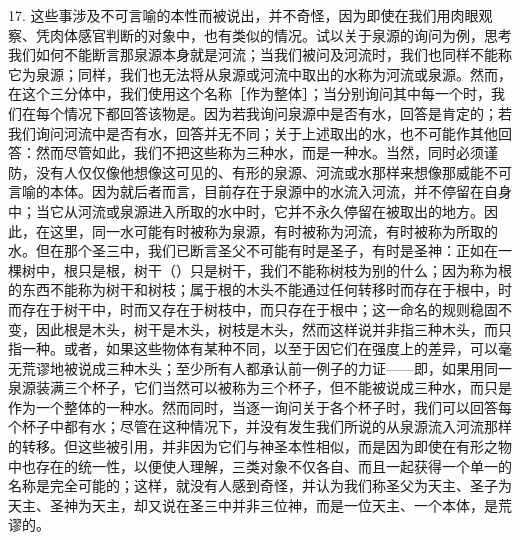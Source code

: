 17. 这些事涉及不可言喻的本性而被说出，并不奇怪，因为即使在我们用肉眼观察、凭肉体感官判断的对象中，也有类似的情况。试以关于泉源的询问为例，思考我们如何不能断言那泉源本身就是河流；当我们被问及河流时，我们也同样不能称它为泉源；同样，我们也无法将从泉源或河流中取出的水称为河流或泉源。然而，在这个三分体中，我们使用这个名称［作为整体］；当分别询问其中每一个时，我们在每个情况下都回答该物是。因为若我询问泉源中是否有水，回答是肯定的；若我们询问河流中是否有水，回答并无不同；关于上述取出的水，也不可能作其他回答：然而尽管如此，我们不把这些称为三种水，而是一种水。当然，同时必须谨防，没有人仅仅像他想像这可见的、有形的泉源、河流或水那样来想像那威能不可言喻的本体。因为就后者而言，目前存在于泉源中的水流入河流，并不停留在自身中；当它从河流或泉源进入所取的水中时，它并不永久停留在被取出的地方。因此，在这里，同一水可能有时被称为泉源，有时被称为河流，有时被称为所取的水。但在那个圣三中，我们已断言圣父不可能有时是圣子，有时是圣神：正如在一棵树中，根只是根，树干（）只是树干，我们不能称树枝为别的什么；因为称为根的东西不能称为树干和树枝；属于根的木头不能通过任何转移时而存在于根中，时而存在于树干中，时而又存在于树枝中，而只存在于根中；这一命名的规则稳固不变，因此根是木头，树干是木头，树枝是木头，然而这样说并非指三种木头，而只指一种。或者，如果这些物体有某种不同，以至于因它们在强度上的差异，可以毫无荒谬地被说成三种木头；至少所有人都承认前一例子的力证——即，如果用同一泉源装满三个杯子，它们当然可以被称为三个杯子，但不能被说成三种水，而只是作为一个整体的一种水。然而同时，当逐一询问关于各个杯子时，我们可以回答每个杯子中都有水；尽管在这种情况下，并没有发生我们所说的从泉源流入河流那样的转移。但这些被引用，并非因为它们与神圣本性相似，而是因为即使在有形之物中也存在的统一性，以便使人理解，三类对象不仅各自、而且一起获得一个单一的名称是完全可能的；这样，就没有人感到奇怪，并认为我们称圣父为天主、圣子为天主、圣神为天主，却又说在圣三中并非三位神，而是一位天主、一个本体，是荒谬的。\par

